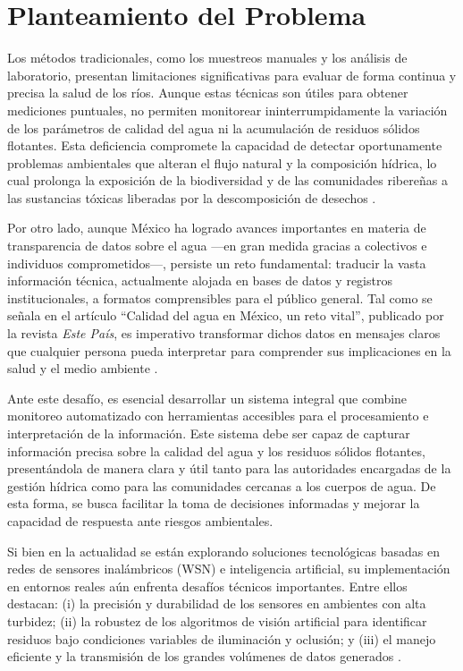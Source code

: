 \section{Planteamiento del Problema}

Los métodos tradicionales, como los muestreos manuales y los análisis de laboratorio, presentan limitaciones significativas para evaluar de forma continua y precisa la salud de los ríos. Aunque estas técnicas son útiles para obtener mediciones puntuales, no permiten monitorear ininterrumpidamente la variación de los parámetros de calidad del agua ni la acumulación de residuos sólidos flotantes. Esta deficiencia compromete la capacidad de detectar oportunamente problemas ambientales que alteran el flujo natural y la composición hídrica, lo cual prolonga la exposición de la biodiversidad y de las comunidades ribereñas a las sustancias tóxicas liberadas por la descomposición de desechos \cite{monitoreo2023}.

Por otro lado, aunque México ha logrado avances importantes en materia de transparencia de datos sobre el agua —en gran medida gracias a colectivos e individuos comprometidos—, persiste un reto fundamental: traducir la vasta información técnica, actualmente alojada en bases de datos y registros institucionales, a formatos comprensibles para el público general. Tal como se señala en el artículo ``Calidad del agua en México, un reto vital'', publicado por la revista \textit{Este País}, es imperativo transformar dichos datos en mensajes claros que cualquier persona pueda interpretar para comprender sus implicaciones en la salud y el medio ambiente \cite{estepais2024}.

Ante este desafío, es esencial desarrollar un sistema integral que combine monitoreo automatizado con herramientas accesibles para el procesamiento e interpretación de la información. Este sistema debe ser capaz de capturar información precisa sobre la calidad del agua y los residuos sólidos flotantes, presentándola de manera clara y útil tanto para las autoridades encargadas de la gestión hídrica como para las comunidades cercanas a los cuerpos de agua. De esta forma, se busca facilitar la toma de decisiones informadas y mejorar la capacidad de respuesta ante riesgos ambientales\cite{monitoreo2023}.

Si bien en la actualidad se están explorando soluciones tecnológicas basadas en redes de sensores inalámbricos (WSN) e inteligencia artificial, su implementación en entornos reales aún enfrenta desafíos técnicos importantes. Entre ellos destacan: (i) la precisión y durabilidad de los sensores en ambientes con alta turbidez; (ii) la robustez de los algoritmos de visión artificial para identificar residuos bajo condiciones variables de iluminación y oclusión; y (iii) el manejo eficiente y la transmisión de los grandes volúmenes de datos generados \cite{monitoreo2023}.

